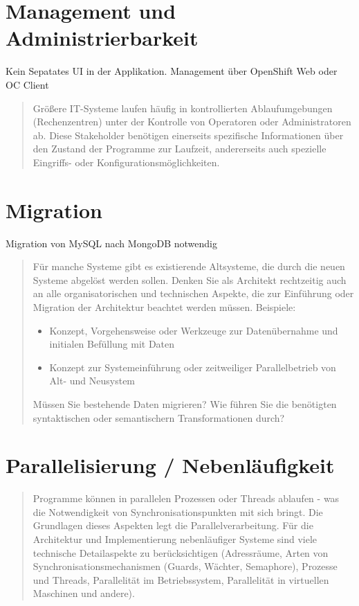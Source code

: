 \section{Management und Administrierbarkeit}

Kein Sepatates UI in der Applikation. Management über OpenShift Web oder OC Client

\begin{quote}
	Größere IT-Systeme laufen häufig in kontrollierten Ablaufumgebungen (Rechenzentren) unter der Kontrolle von Operatoren oder Administratoren ab. Diese Stakeholder benötigen einerseits spezifische Informationen über den Zustand der Programme zur Laufzeit, andererseits auch spezielle Eingriffs- oder Konfigurationsmöglichkeiten.
\end{quote}

\section{Migration}

Migration von MySQL nach MongoDB notwendig

\begin{quote}
	Für manche Systeme gibt es existierende Altsysteme, die durch die neuen Systeme abgelöst werden sollen. Denken Sie als Architekt rechtzeitig auch an alle organisatorischen und technischen Aspekte, die zur Einführung oder Migration der Architektur beachtet werden müssen.
	Beispiele:
	\begin{itemize}
		\item Konzept, Vorgehensweise oder Werkzeuge zur Datenübernahme und initialen Befüllung mit Daten
		\item Konzept zur Systemeinführung oder zeitweiliger Parallelbetrieb von Alt- und Neusystem
	\end{itemize}
	Müssen Sie bestehende Daten migrieren? Wie führen Sie die benötigten syntaktischen oder semantischern Transformationen durch?
\end{quote}

\section{Parallelisierung / Nebenläufigkeit}

\begin{quote}
	Programme können in parallelen Prozessen oder Threads ablaufen - was die Notwendigkeit von Synchronisationspunkten mit sich bringt. Die Grundlagen dieses Aspekten legt die Parallelverarbeitung. Für die Architektur und Implementierung nebenläufiger Systeme sind viele technische Detailaspekte zu berücksichtigen (Adressräume, Arten von Synchronisationsmechanismen (Guards, Wächter, Semaphore), Prozesse und Threads, Parallelität im Betriebssystem, Parallelität in virtuellen Maschinen und andere).
\end{quote}

